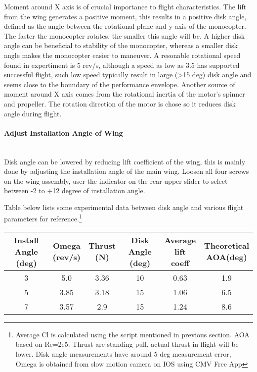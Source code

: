 \documentclass[12pt]{article}
\newcommand{\pa}[1]{\paragraph{#1}\mbox{}\\}
\begin{document}
Moment around X axis is of crucial importance to flight characteristics. The lift from the wing generates a positive moment, this results in a positive disk angle, defined as the angle between the rotational plane and y axis of the monocopter. The faster the monocopter rotates, the smaller this angle will be. A higher disk angle can be beneficial to stability of the monocopter, whereas a smaller disk angle makes the monocopter easier to maneuver. A resonable rotational speed found in expertiment is 5 rev/s, although a speed as low as 3.5 has supported successful flight, such low speed typically result in large (>15 deg) disk angle and seems close to the boundary of the performance envelope. Another source of moment around X axis comes from the rotational inertia of the motor's spinner and propeller. The rotation direction of the motor is chose so it reduces disk angle during flight. 

\pa{Adjust Installation Angle of Wing}
Disk angle can be lowered by reducing lift coefficient of the wing, this is mainly done by adjusting the installation angle of the main wing. Loosen all four screws on the wing assembly, user the indicator on the rear upper slider to select between -2 to +12 degree of installation angle. 

Table below lists some experimental data between disk angle and various flight parameters for reference.\footnote{Average Cl is calculated using the script mentioned in previous section. AOA based on Re=2e5. Thrust are standing pull, actual thrust in flight will be lower. Disk angle measurements have around 5 deg measurement error, Omega is obtained from slow motion camera on IOS using CMV Free App}

\begin{table}[]
  \begin{tabular}{|c|c|c|c|c|c|}
    \hline 
    \makecell{Install Angle \\ (deg)} & \makecell{Omega \\ (rev/s)} & \makecell{Thrust \\ (N)} & \makecell{Disk Angle \\ (deg)} & \makecell{Average \\ lift coeff} & \makecell{Theoretical \\ AOA(deg)} \\\hline
    3                  & 5.0           & 3.36      & 10              & 0.63         & 1.9                  \\\hline
    5                  & 3.85          & 3.18      & 15              & 1.06         & 6.5                  \\\hline
    7                  & 3.57          & 2.9       & 15              & 1.24         & 8.6                 \\\hline
  \end{tabular}
\end{table}
\end{document}
